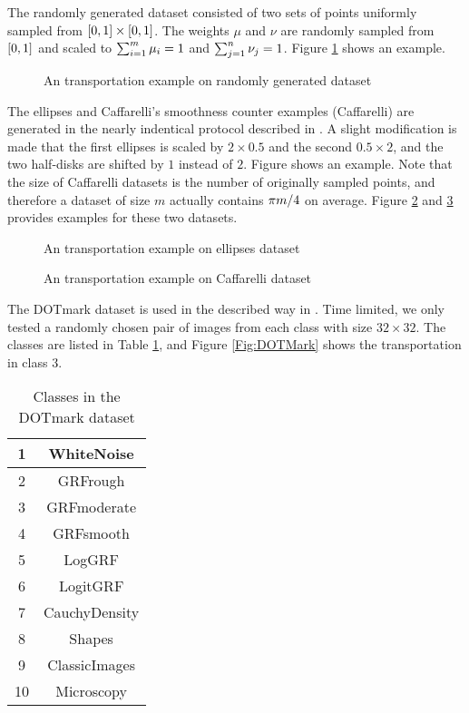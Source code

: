 \documentclass[english]{pkupaper}
\begin{document}
The randomly generated dataset consisted of two sets of points uniformly sampled from $ \left[  0, 1  \right] \times \left[  0, 1  \right] $. The weights $\mu$ and $\nu$ are randomly sampled from $ \left[  0, 1  \right] $ and scaled to $ \sum_{ {i} = {1} }^{m}{\mu_i} = 1 $ and $ \sum_{ {j} = {1} }^{n}{\nu_j} = 1 $. Figure \ref{Fig:Random} shows an example.

\begin{figure}
\centering \scalebox{0.65}{}
\caption{An transportation example on randomly generated dataset} \label{Fig:Random}
\end{figure}

The ellipses and Caffarelli's smoothness counter examples (Caffarelli) are generated in the nearly indentical protocol described in \parencite{Gerber2017}. A slight modification is made that the first ellipses is scaled by $ 2 \times 0.5 $ and the second $ 0.5 \times 2 $, and the two half-disks are shifted by $1$ instead of $2$. Figure shows an example. Note that the size of Caffarelli datasets is the number of originally sampled points, and therefore a dataset of size $m$ actually contains $ \pi m / 4 $ on average. Figure \ref{Fig:Ellipse} and \ref{Fig:Caff} provides examples for these two datasets.

\begin{figure}
\centering \scalebox{0.65}{} 
\caption{An transportation example on ellipses dataset} \label{Fig:Ellipse}
\end{figure}

\begin{figure}
\centering \scalebox{0.65}{}
\caption{An transportation example on  Caffarelli dataset} \label{Fig:Caff}
\end{figure}

The DOTmark dataset is used in the described way in \parencite{Schrieber2017}. Time limited, we only tested a randomly chosen pair of images from each class with size $ 32 \times 32 $. The classes are listed in Table \ref{Tbl:DOTmark}, and Figure \ref{Fig:DOTMark} shows the transportation in class 3.

\begin{table}[htbp]
\centering
\begin{tabular}{|c|c|}
\hline
1 & WhiteNoise \\ \hline
2 & GRFrough \\ \hline
3 & GRFmoderate \\ \hline
4 & GRFsmooth \\ \hline
5 & LogGRF \\ \hline
6 & LogitGRF \\ \hline
7 & CauchyDensity \\ \hline
8 & Shapes \\ \hline
9 & ClassicImages \\ \hline
10 & Microscopy \\ \hline
\end{tabular}
\caption{Classes in the DOTmark dataset} \label{Tbl:DOTmark}
\end{table}
\end{document}

